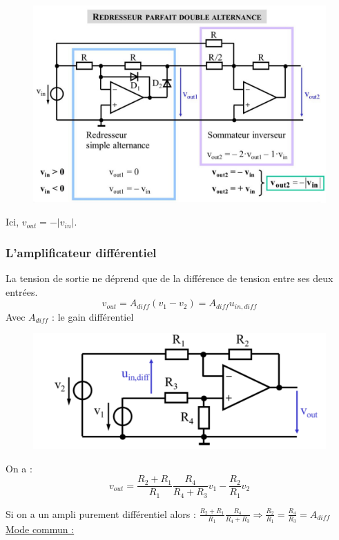 \documentclass[../main.tex]{subfiles}
\begin{document}
\begin{figure}[hbt!]
    \centering
    \includegraphics[width=.6\textwidth]{IMAGES/elec/IMG_0139.jpeg}
\end{figure}

Ici, $v_{out} = - \lvert v_{in}\rvert$.\\

\subsubsection{L'amplificateur différentiel}
La tension de sortie ne déprend que de la différence de tension entre ses deux entrées. \begin{equation}
    v_{out} = A_{diff} (v_1-v_2) = A_{diff} u_{in,diff}
\end{equation}
Avec $A_{diff}$ : le gain différentiel\\

\begin{figure}[hbt!]
    \centering
    \includegraphics[width=.6\textwidth]{IMAGES/elec/IMG_0140.jpeg}
\end{figure}

On a : \begin{equation}
    v_{out} = \frac{R_2+R_1}{R_1} \frac{R_4}{R_4+R_3} v_1 - \frac{R_2}{R_1}v_2
\end{equation}

Si on a un ampli purement différentiel alors : $\frac{R_2+R_1}{R_1} \frac{R_4}{R_4+R_3} \Rightarrow \frac{R_2}{R_1} = \frac{R_4}{R_3} = A_{diff}$\\

\quad \underline{Mode commun :}\\
\end{document}
